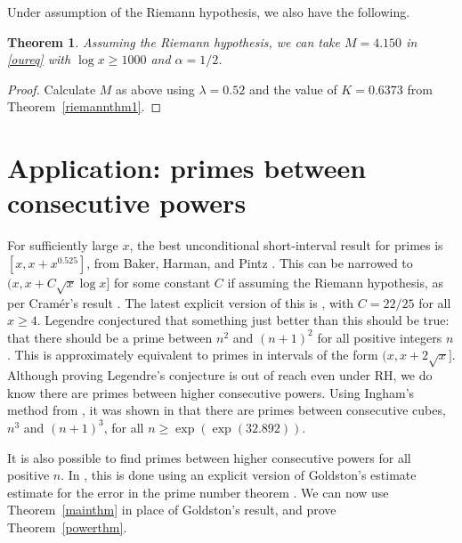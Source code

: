 \documentclass[reqno]{amsart}
\newtheorem{theorem}{Theorem}[section]
\numberwithin{equation}{section}
\theoremstyle{remark}
\begin{document}
Under assumption of the Riemann hypothesis, we also have the following.
\begin{theorem}\label{riemannthm2}
    Assuming the Riemann hypothesis, we can take $M=4.150$ in \eqref{oureq} with $\log x\geq 1000$ and $\alpha=1/2$. 
\end{theorem}
\begin{proof}
    Calculate $M$ as above using $\lambda=0.52$ and the value of $K=0.6373$ from Theorem~\ref{riemannthm1}.
\end{proof}

\section{Application: primes between consecutive powers}\label{powersect}

For sufficiently large $x$, the best unconditional short-interval result for primes is $[x,x+x^{0.525}]$, from Baker, Harman, and Pintz \cite{B_H_P_2001}. This can be narrowed to $(x,x+C\sqrt{x}\log x]$ for some constant $C$ if assuming the Riemann hypothesis, as per Cram{\'e}r's result \cite{cramer1936order}. The latest explicit version of this is \cite[Thm.~1.5]{C_M_S_19}, with $C=22/25$ for all $x\geq 4$. Legendre conjectured that something just better than this should be true: that there should be a prime between $n^2$ and $(n+1)^2$ for all positive integers $n$. This is approximately equivalent to primes in intervals of the form $(x,x+2\sqrt{x}]$. Although proving Legendre's conjecture is out of reach even under RH, we do know there are primes between higher consecutive powers. Using Ingham's method from \cite{Ingham_37}, it was shown in \cite{cully2023primes} that there are primes between consecutive cubes, $n^3$ and $(n+1)^3$, for all $n\geq \exp(\exp(32.892))$.

It is also possible to find primes between higher consecutive powers for all positive $n$. In \cite{cully2023primes}, this is done using an explicit version of Goldston's estimate estimate for the error in the prime number theorem \cite{Goldston_83}. We can now use Theorem~\ref{mainthm} in place of Goldston's result, and prove Theorem~\ref{powerthm}.
\end{document}
